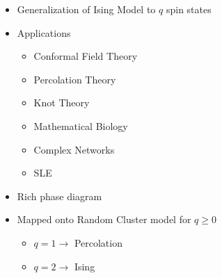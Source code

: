 \documentclass{umthesis}          %
\begin{document}
\begin{itemize}

\item Generalization of Ising Model to $q$ spin states\\
\label{sec-4.1.1.1}


\item Applications\\
\label{sec-4.1.1.2}

\begin{itemize}

\item Conformal Field Theory\\
\label{sec-4.1.1.2.1}


\item Percolation Theory\\
\label{sec-4.1.1.2.2}


\item Knot Theory\\
\label{sec-4.1.1.2.3}


\item Mathematical Biology\\
\label{sec-4.1.1.2.4}


\item Complex Networks\\
\label{sec-4.1.1.2.5}


\item SLE\\
\label{sec-4.1.1.2.6}

\end{itemize} %

\label{sec-4.1.1.3}


\item Rich phase diagram\\
\label{sec-4.1.1.4}


\item Mapped onto Random Cluster model for $q \ge 0$\\
\label{sec-4.1.1.5}

\begin{itemize}

\item $q = 1 \to$ Percolation\\
\label{sec-4.1.1.5.1}


\item $q = 2 \to$ Ising\\
\label{sec-4.1.1.5.2}


\end{itemize}
\end{itemize}
\end{document}
